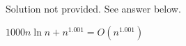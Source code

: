 
    Solution not provided.
    See answer below.
    
$1000 n \ln n + n^{1.001} = O(n^{1.001})$
    
